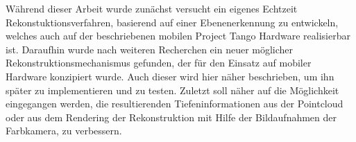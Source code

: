 Während dieser Arbeit wurde zunächst versucht ein eigenes Echtzeit Rekonstuktionsverfahren, basierend auf einer Ebenenerkennung zu entwickeln, welches auch auf der beschriebenen mobilen Project Tango Hardware realisierbar ist. Daraufhin wurde nach weiteren Recherchen ein neuer möglicher Rekonstruktionsmechanismus gefunden, der für den Einsatz auf mobiler Hardware konzipiert wurde. Auch dieser wird hier näher beschrieben, um ihn später zu implementieren und zu testen. Zuletzt soll näher auf die Möglichkeit eingegangen werden, die resultierenden Tiefeninformationen aus der Pointcloud oder aus dem Rendering der Rekonstruktion mit Hilfe der Bildaufnahmen der Farbkamera, zu verbessern. \\









